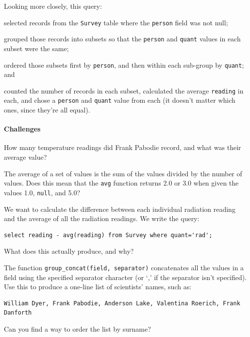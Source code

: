 \documentclass{book}
\begin{document}
Looking more closely, this query:

\begin{swcenumerate}
\item
  selected records from the \texttt{Survey} table where the
  \texttt{person} field was not null;
\item
  grouped those records into subsets so that the \texttt{person} and
  \texttt{quant} values in each subset were the same;
\item
  ordered those subsets first by \texttt{person}, and then within each
  sub-group by \texttt{quant}; and
\item
  counted the number of records in each subset, calculated the average
  \texttt{reading} in each, and chose a \texttt{person} and
  \texttt{quant} value from each (it doesn't matter which ones, since
  they're all equal).
\end{swcenumerate}

\mbox{}\paragraph{Challenges}

\begin{swcenumerate}
\item
  How many temperature readings did Frank Pabodie record, and what was
  their average value?
\item
  The average of a set of values is the sum of the values divided by the
  number of values. Does this mean that the \texttt{avg} function
  returns 2.0 or 3.0 when given the values 1.0, \texttt{null}, and 5.0?
\item
  We want to calculate the difference between each individual radiation
  reading and the average of all the radiation readings. We write the
  query:

\begin{verbatim}
select reading - avg(reading) from Survey where quant='rad';
\end{verbatim}

  What does this actually produce, and why?
\item
  The function \texttt{group\_concat(field, separator)} concatenates all
  the values in a field using the specified separator character (or `,'
  if the separator isn't specified). Use this to produce a one-line list
  of scientists' names, such as:

\begin{verbatim}
William Dyer, Frank Pabodie, Anderson Lake, Valentina Roerich, Frank Danforth
\end{verbatim}

  Can you find a way to order the list by surname?
\end{swcenumerate}
\end{document}
